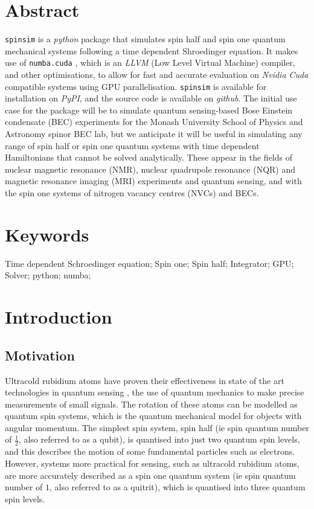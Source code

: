 \documentclass{jors}
\begin{document}
\section*{Abstract}
	\texttt{spinsim} is a \emph{python} package that simulates spin half and spin one quantum mechanical systems following a time dependent Shroedinger equation. It makes use of \texttt{numba.cuda} \cite{lam_numba_2015}, which is an \emph{LLVM} (Low Level Virtual Machine) \cite{lattner_llvm_2004} compiler, and other optimisations, to allow for fast and accurate evaluation on \emph{Nvidia Cuda} \cite{nickolls_scalable_2008} compatible systems using GPU parallelisation. \texttt{spinsim} is available for installation on \emph{PyPI}, and the source code is available on \emph{github}. The initial use case for the package will be to simulate quantum sensing-based Bose Einstein condensate (BEC) experiments for the Monash University School of Physics and Astronomy spinor BEC lab, but we anticipate it will be useful in simulating any range of spin half or spin one quantum systems with time dependent Hamiltonians that cannot be solved analytically. These appear in the fields of nuclear magnetic resonance (NMR), nuclear quadrupole resonance (NQR) and magnetic resonance imaging (MRI) experiments and quantum sensing, and with the spin one systems of nitrogen vacancy centres (NVCs) and BECs.

\section*{Keywords}
Time dependent Schroedinger equation; Spin one; Spin half; Integrator; GPU; Solver; python; numba;

\section*{Introduction}
\subsection*{Motivation}
	Ultracold rubidium atoms have proven their effectiveness in state of the art technologies in quantum sensing \cite{degen_quantum_2017}, the use of quantum mechanics to make precise measurements of small signals. The rotation of these atoms can be modelled as quantum spin systems, which is the quantum mechanical model for objects with angular momentum. The simplest spin system, spin half (ie spin quantum number of \(\frac12\), also referred to as a qubit), is quantised into just two quantum spin levels, and this describes the motion of some fundamental particles such as electrons. However, systems more practical for sensing, such as ultracold rubidium atoms, are more accurately described as a spin one quantum system (ie spin quantum number of \(1\), also referred to as a quitrit), which is quantised into three quantum spin levels.
	
\end{document}
